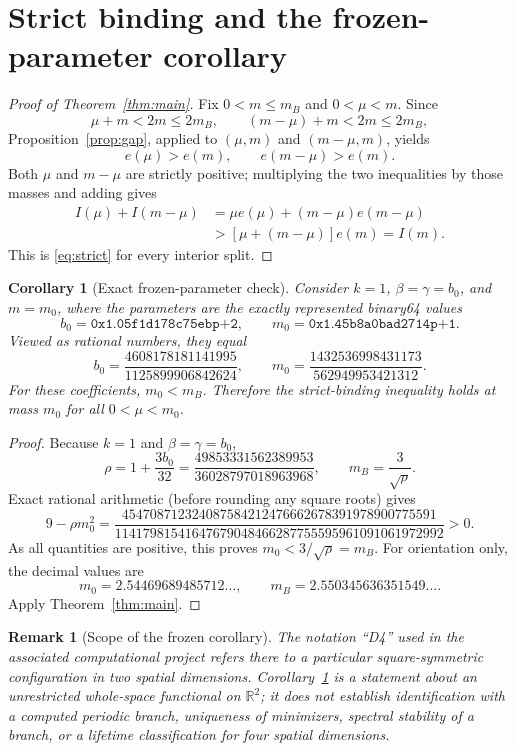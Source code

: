 \documentclass[11pt,letterpaper]{article}
\numberwithin{equation}{section}
\newtheorem{corollary}[theorem]{Corollary}
\newtheorem{remark}[theorem]{Remark}
\newcommand{\RR}{\mathbb R}
\begin{document}
\section{Strict binding and the frozen-parameter corollary}

\begin{proof}[Proof of Theorem~\ref{thm:main}]
Fix $0<m\le m_B$ and $0<\mu<m$. Since
\[
 \mu+m<2m\le2m_B,
 \qquad (m-\mu)+m<2m\le2m_B,
\]
Proposition~\ref{prop:gap}, applied to $(\mu,m)$ and $(m-\mu,m)$, yields
\[
 e(\mu)>e(m),\qquad e(m-\mu)>e(m).
\]
Both $\mu$ and $m-\mu$ are strictly positive; multiplying the two inequalities by those masses and adding gives
\[
 \begin{aligned}
 I(\mu)+I(m-\mu)
 &=\mu e(\mu)+(m-\mu)e(m-\mu)\\
 &>[\mu+(m-\mu)]e(m)=I(m).
 \end{aligned}
\]
This is \eqref{eq:strict} for every interior split.
\end{proof}

\begin{corollary}[Exact frozen-parameter check]\label{cor:frozen}
Consider $k=1$, $\beta=\gamma=b_0$, and $m=m_0$, where the parameters are the exactly represented binary64 values
\[
 b_0=\texttt{0x1.05f1d178c75ebp+2},\qquad
 m_0=\texttt{0x1.45b8a0bad2714p+1}.
\]
Viewed as rational numbers, they equal
\[
 b_0=\frac{4608178181141995}{1125899906842624},\qquad
 m_0=\frac{1432536998431173}{562949953421312}.
\]
For these coefficients, $m_0<m_B$. Therefore the strict-binding inequality holds at mass $m_0$ for all $0<\mu<m_0$.
\end{corollary}
\begin{proof}
Because $k=1$ and $\beta=\gamma=b_0$,
\[
 \rho=1+\frac{3b_0}{32}
 =\frac{49853331562389953}{36028797018963968},
 \qquad m_B=\frac{3}{\sqrt\rho}.
\]
Exact rational arithmetic (before rounding any square roots) gives
\begin{equation}\label{eq:frozen-rational}
 9-\rho m_0^2=
 \frac{454708712324087584212476662678391978900775591}
 {11417981541647679048466287755595961091061972992}>0.
\end{equation}
As all quantities are positive, this proves $m_0<3/\sqrt\rho=m_B$. For orientation only, the decimal values are
\[
 m_0=2.54469689485712\ldots,\qquad
 m_B=2.550345636351549\ldots.
\]
Apply Theorem~\ref{thm:main}.
\end{proof}

\begin{remark}[Scope of the frozen corollary]
The notation ``D4'' used in the associated computational project refers there to a particular square-symmetric configuration in two spatial dimensions. Corollary~\ref{cor:frozen} is a statement about an unrestricted whole-space functional on $\RR^2$; it does not establish identification with a computed periodic branch, uniqueness of minimizers, spectral stability of a branch, or a lifetime classification for four spatial dimensions.
\end{remark}
\end{document}
